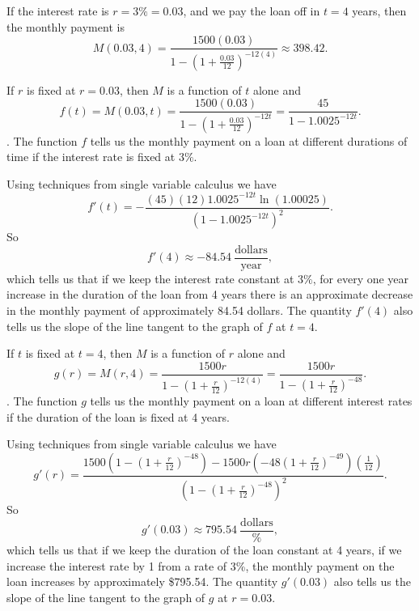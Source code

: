 \begin{activitySolution}
 \ba
  \item If the interest rate is $r=3\% = 0.03$, and we pay the loan off in $t=4$ years, then the monthly payment is
  \[M(0.03,4) =   \frac{1500(0.03)}{1-\left(1+\frac{0.03}{12}\right)^{-12(4)}} \approx 398.42.\]

  \item If $r$ is fixed at $r=0.03$, then $M$ is a function of $t$ alone and 
\[f(t) = M(0.03,t) =  \frac{1500(0.03)}{1-\left(1+\frac{0.03}{12}\right)^{-12t}} = \frac{45}{1-1.0025^{-12t}}.\]
. The function $f$ tells us the monthly payment on a loan at different durations of time if the interest rate is fixed at $3\%$. 

  \item Using techniques from single variable calculus we have 
\[f'(t) = -\frac{(45)(12)1.0025^{-12t}\ln(1.00025)}{\left(1-1.0025^{-12t}\right)^2}.\]
So 
\[f'(4) \approx -84.54 \ \frac{\text{dollars}}{\text{year}},\]
which tells us that if we keep the interest rate constant at $3\%$, for every one year increase in the duration of the loan from 4 years there is an approximate decrease in the monthly payment of approximately 84.54 dollars. The quantity $f'(4)$ also tells us the slope of the line tangent to the graph of $f$ at $t=4$. 

  \item If $t$ is fixed at $t=4$, then $M$ is a function of $r$ alone and 
\[g(r) = M(r,4) = \frac{1500r}{1-\left(1+\frac{r}{12}\right)^{-12(4)}} = \frac{1500r}{1-\left(1+\frac{r}{12}\right)^{-48}}.\]
. The function $g$ tells us the monthly payment on a loan at different interest rates if the duration of the loan is fixed at 4 years.


  \item Using techniques from single variable calculus we have 
\[g'(r) = \frac{1500\left(1-\left(1+\frac{r}{12}\right)^{-48}\right) - 1500r\left(-48\left(1+\frac{r}{12}\right)^{-49}\right)\left(\frac{1}{12}\right)}{\left(1-\left(1+\frac{r}{12}\right)^{-48}\right)^2}.\]
So 
\[g'(0.03) \approx 795.54 \ \frac{\text{dollars}}{\text{\%}},\]
which tells us that if we keep the duration of the loan constant at 4 years, if we increase the interest rate by 1 from a rate of 3\%, the monthly payment on the loan increases by approximately \$795.54. The quantity $g'(0.03)$ also tells us the slope of the line tangent to the graph of $g$ at $r=0.03$. 

    \ea
  

\end{activitySolution}
\afterpa 